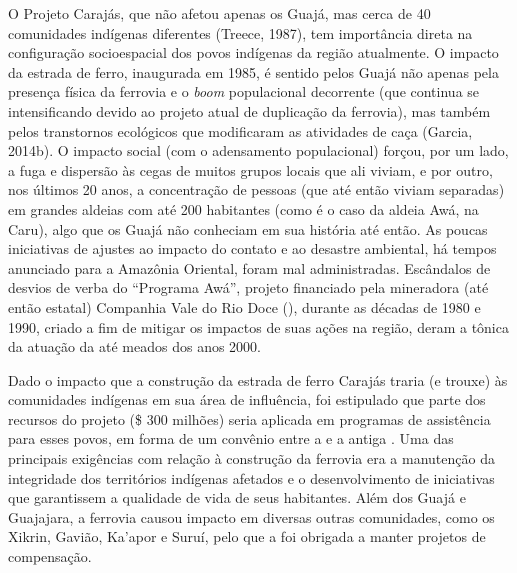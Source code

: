 O Projeto Carajás, que não afetou apenas os Guajá, mas cerca de 40
comunidades indígenas diferentes (Treece, 1987), tem importância direta
na configuração socioespacial dos povos indígenas da região atualmente.
O impacto da estrada de ferro, inaugurada em 1985, é sentido pelos Guajá
não apenas pela presença física da ferrovia e o \emph{boom} populacional
decorrente (que continua se intensificando devido ao projeto atual de
duplicação da ferrovia), mas também pelos transtornos ecológicos que
modificaram as atividades de caça (Garcia, 2014b). O impacto social (com
o adensamento populacional) forçou, por um lado, a fuga e dispersão às
cegas de muitos grupos locais que ali viviam, e por outro, nos últimos
20 anos, a concentração de pessoas (que até então viviam separadas) em
grandes aldeias com até 200 habitantes (como é o caso da aldeia
Awá, na  Caru), algo que os Guajá não conheciam em sua história
até então. As poucas iniciativas de ajustes ao impacto do contato e ao
desastre ambiental, há tempos anunciado para a Amazônia Oriental, foram
mal administradas. Escândalos de desvios de verba do ``Programa Awá'',
projeto financiado pela mineradora (até então estatal) Companhia Vale do
Rio Doce (), durante as décadas de 1980 e 1990, criado a fim de
mitigar os impactos de suas ações na região, deram a tônica da atuação
da  até meados dos anos 2000.

Dado o impacto que a construção da estrada de ferro Carajás traria (e
trouxe) às comunidades indígenas em sua área de influência, foi
estipulado que parte dos recursos do projeto (\$ 300 milhões) seria
aplicada em programas de assistência para esses povos, em forma de um
convênio entre a  e a antiga . Uma das principais exigências
com relação à construção da ferrovia era a manutenção da integridade dos
territórios indígenas afetados e o desenvolvimento de iniciativas que
garantissem a qualidade de vida de seus habitantes. Além dos Guajá e
Guajajara, a ferrovia causou impacto em diversas outras comunidades,
como os Xikrin, Gavião, Ka'apor e Suruí, pelo que a  foi obrigada a
manter projetos de compensação.


